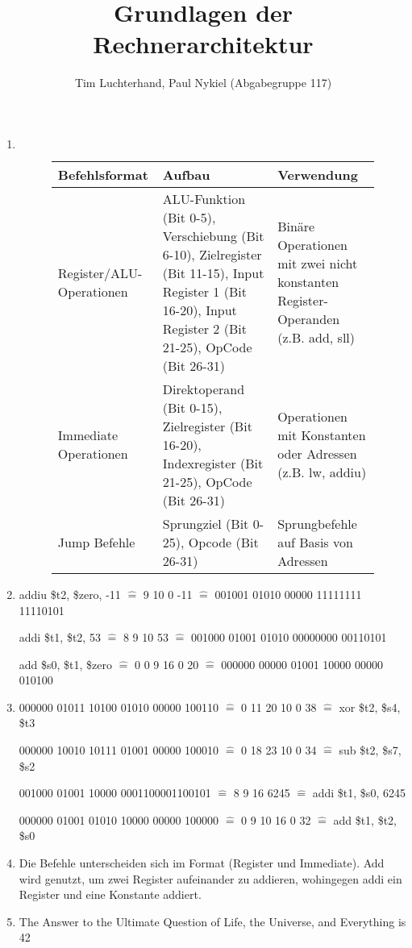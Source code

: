 \documentclass[DIN, pagenumber=false, fontsize=11pt, parskip=half]{scrartcl}
\title{Grundlagen der Rechnerarchitektur}
\author{Tim Luchterhand, Paul Nykiel (Abgabegruppe 117)}
\begin{document}
    \maketitle
    \section{}
    \begin{enumerate}[label=(\alph*)]
        \item $ $
            \begin{figure}[H]
                \centering
                \begin{tabular}{lp{5cm}p{4cm}}
                    \toprule
                    Befehlsformat & Aufbau & Verwendung \\
                    \midrule
                    Register/ALU-Operationen & ALU-Funktion (Bit 0-5), Verschiebung (Bit 6-10), Zielregister (Bit 11-15), Input Register 1 (Bit 16-20), Input Register 2 (Bit 21-25), OpCode (Bit 26-31) & 
                    Binäre Operationen mit zwei nicht konstanten Register-Operanden (z.B. add, sll) \\
                    Immediate Operationen & Direktoperand (Bit 0-15), Zielregister (Bit 16-20), Indexregister (Bit 21-25), OpCode (Bit 26-31) & Operationen mit Konstanten oder Adressen (z.B. lw, addiu)\\
                    Jump Befehle & Sprungziel (Bit 0-25), Opcode (Bit 26-31) & Sprungbefehle auf Basis von Adressen \\
                    \bottomrule
                \end{tabular}
            \end{figure}
        \item 
            addiu \$t2, \$zero, -11 $\hat{=}$ 9 10 0 -11 $\hat{=}$ 001001 01010 00000 11111111 11110101

            addi \$t1, \$t2, 53 $\hat{=}$ 8 9 10 53 $\hat{=}$ 001000 01001 01010 00000000 00110101

            add \$s0, \$t1, \$zero $\hat{=}$ 0 0 9 16 0 20 $\hat{=}$ 000000 00000 01001 10000 00000 010100

        \item
            000000 01011 10100 01010 00000 100110 $\hat{=}$ 0 11 20 10 0 38 $\hat{=}$ xor \$t2, \$s4, \$t3

            000000 10010 10111 01001 00000 100010 $\hat{=}$ 0 18 23 10 0 34 $\hat{=}$ sub \$t2, \$s7, \$s2

            001000 01001 10000 0001100001100101 $\hat{=}$ 8 9 16 6245 $\hat{=}$ addi \$t1, \$s0, 6245

            000000 01001 01010 10000 00000 100000 $\hat{=}$ 0 9 10 16 0 32 $\hat{=}$ add \$t1, \$t2, \$s0
        \item
            Die Befehle unterscheiden sich im Format (Register und Immediate). Add wird genutzt, um zwei Register aufeinander zu addieren, wohingegen addi ein Register und eine Konstante addiert.

        \item
            \glqq{}The Answer to the Ultimate Question of Life, the Universe, and Everything is 42\grqq{}
    \end{enumerate}
\end{document}
